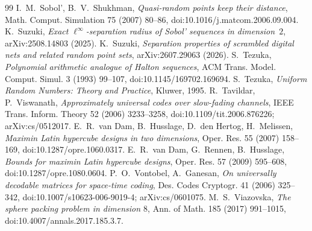 \documentclass[11pt]{amsart}
\theoremstyle{definition}
\theoremstyle{plain}
\begin{document}
\begin{thebibliography}{99}
 I.~M.~Sobol', B.~V.~Shukhman, \emph{Quasi-random points keep their distance}, Math. Comput. Simulation 75 (2007) 80--86, doi:10.1016/j.matcom.2006.09.004.
 K.~Suzuki, \emph{Exact $\ell^\infty$-separation radius of Sobol' sequences in dimension~$2$}, arXiv:2508.14803 (2025).
 K.~Suzuki, \emph{Separation properties of scrambled digital nets and related random point sets}, arXiv:2607.29063 (2026).
 S.~Tezuka, \emph{Polynomial arithmetic analogue of Halton sequences}, ACM Trans. Model. Comput. Simul. 3 (1993) 99--107, doi:10.1145/169702.169694.
 S.~Tezuka, \emph{Uniform Random Numbers: Theory and Practice}, Kluwer, 1995.
 R.~Tavildar, P.~Viswanath, \emph{Approximately universal codes over slow-fading channels}, IEEE Trans. Inform. Theory 52 (2006) 3233--3258, doi:10.1109/tit.2006.876226; arXiv:cs/0512017.
 E.~R.~van Dam, B.~Husslage, D.~den Hertog, H.~Melissen, \emph{Maximin Latin hypercube designs in two dimensions}, Oper. Res. 55 (2007) 158--169, doi:10.1287/opre.1060.0317.
 E.~R.~van Dam, G.~Rennen, B.~Husslage, \emph{Bounds for maximin Latin hypercube designs}, Oper. Res. 57 (2009) 595--608, doi:10.1287/opre.1080.0604.
 P.~O.~Vontobel, A.~Ganesan, \emph{On universally decodable matrices for space-time coding}, Des. Codes Cryptogr. 41 (2006) 325--342, doi:10.1007/s10623-006-9019-4; arXiv:cs/0601075.
 M.~S.~Viazovska, \emph{The sphere packing problem in dimension $8$}, Ann. of Math. 185 (2017) 991--1015, doi:10.4007/annals.2017.185.3.7.
\end{thebibliography}
\end{document}
